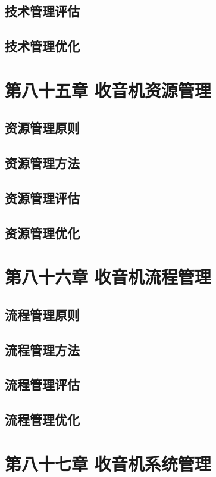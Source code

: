 \documentclass[12pt,UTF8]{ctexbook}
\begin{document}
\section{技术管理评估}
\section{技术管理优化}

\chapter{第八十五章 收音机资源管理}

\section{资源管理原则}
\section{资源管理方法}
\section{资源管理评估}
\section{资源管理优化}

\chapter{第八十六章 收音机流程管理}

\section{流程管理原则}
\section{流程管理方法}
\section{流程管理评估}
\section{流程管理优化}

\chapter{第八十七章 收音机系统管理}
\end{document}
